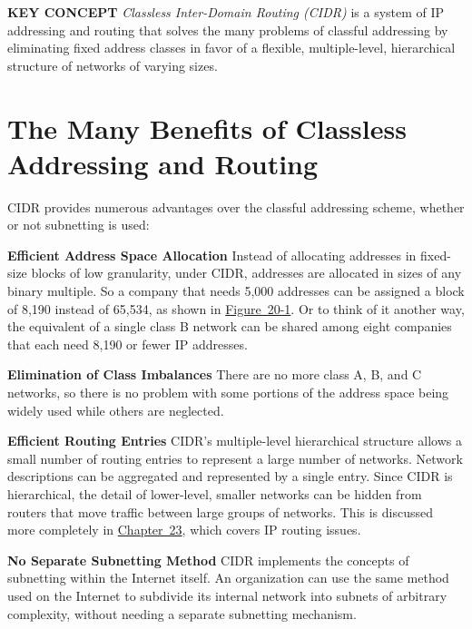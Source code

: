 {\textbf{KEY CONCEPT}} {\emph{Classless Inter-Domain Routing (CIDR)}} is
a system of IP addressing and routing that solves the many problems of
classful addressing by eliminating fixed address classes in favor of a
flexible, multiple-level, hierarchical structure of networks of varying
sizes.

\section{The Many Benefits of Classless Addressing and Routing}

CIDR provides numerous advantages over the classful addressing scheme,
whether or not subnetting is used:

{\textbf{Efficient Address Space Allocation}} Instead of allocating
addresses in fixed-size blocks of low granularity, under CIDR, addresses
are allocated in sizes of any binary multiple. So a company that needs
5,000 addresses can be assigned a block of 8,190 instead of 65,534, as
shown in
\protect\hyperlink{ch20.htmlux5cux23classless_addressing_cidr_solves_the_gra}{Figure~20-1}.
Or to think of it another way, the equivalent of a single class B
network can be shared among eight companies that each need 8,190 or
fewer IP addresses.

{\textbf{Elimination of Class Imbalances}} There are no more class A, B,
and C networks, so there is no problem with some portions of the address
space being widely used while others are neglected.

{\textbf{Efficient Routing Entries}} CIDR's multiple-level hierarchical
structure allows a small number of routing entries to represent a large
number of networks. Network descriptions can be aggregated and
represented by a single entry. Since CIDR is hierarchical, the detail of
lower-level, smaller networks can be hidden from routers that move
traffic between large groups of networks. This is discussed more
completely in \protect\hyperlink{ch23.html}{Chapter~23}, which covers IP
routing issues.

{\textbf{No Separate Subnetting Method}} CIDR implements the concepts of
subnetting within the Internet itself. An organization can use the same
method used on the Internet to subdivide its internal network into
subnets of arbitrary complexity, without needing a separate subnetting
mechanism.

\protect\hypertarget{ch20.htmlux5cux23classless_addressing_cidr_solves_the_gra}{}{}

\protect\hypertarget{ch20.htmlux5cux23I_mediaobject6_d1e21463}{}{}

